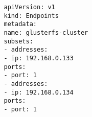 \newpage
{}\label{appendix:Archivos de despliegue: Endpoints glusterfs}


    \begin{verbatim}
				apiVersion: v1
				kind: Endpoints
				metadata:
				name: glusterfs-cluster
				subsets:
				- addresses:
				- ip: 192.168.0.133
				ports:
				- port: 1
				- addresses:
				- ip: 192.168.0.134
				ports:
				- port: 1
\end{verbatim}  
